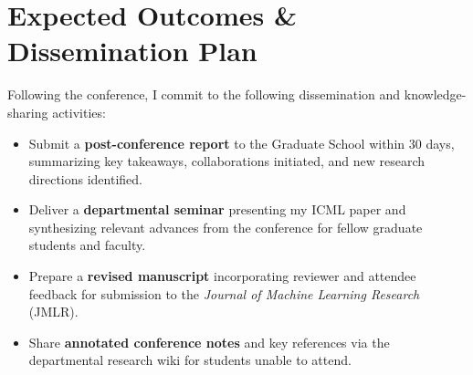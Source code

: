 \section{\faChartBar\hspace{7pt}Expected Outcomes \& Dissemination Plan}

Following the conference, I commit to the following dissemination and knowledge-sharing activities:

\begin{itemize}
  \item Submit a \textbf{post-conference report} to the Graduate School within 30 days, summarizing key takeaways, collaborations initiated, and new research directions identified.
  \item Deliver a \textbf{departmental seminar} presenting my ICML paper and synthesizing relevant advances from the conference for fellow graduate students and faculty.
  \item Prepare a \textbf{revised manuscript} incorporating reviewer and attendee feedback for submission to the \textit{Journal of Machine Learning Research} (JMLR).
  \item Share \textbf{annotated conference notes} and key references via the departmental research wiki for students unable to attend.
\end{itemize}

